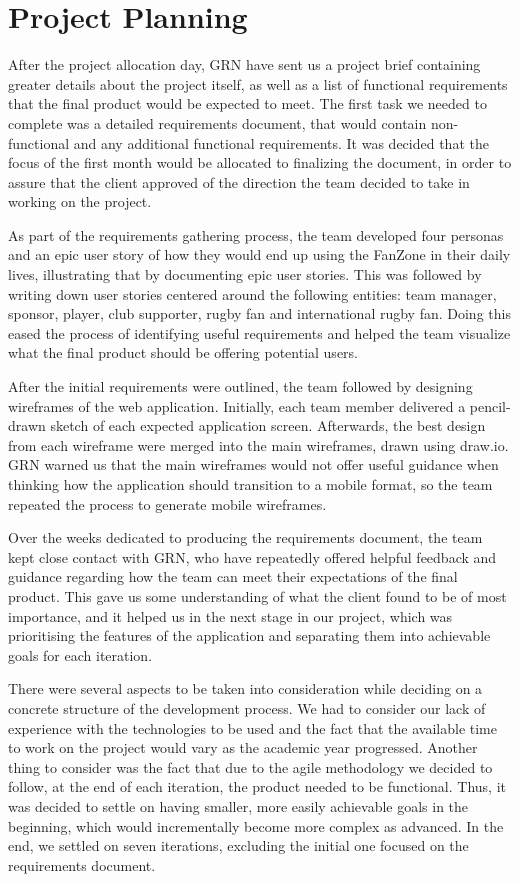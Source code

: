 \documentclass{l3proj}
\begin{document}
\section{Project Planning}
\label{sec:planning}

After the project allocation day, GRN have sent us a project brief containing
 greater details about the project itself, as well as a list of functional
 requirements that the final product would be expected to meet. The first
 task we needed to complete was a detailed requirements document, that would
 contain non-functional and any additional functional requirements. It was
 decided that the focus of the first month would be allocated to finalizing
 the document, in order to assure that the client approved of the direction
 the team decided to take in working on the project.

As part of the requirements gathering process, the team developed four personas
 and an epic user story of how they would end up using the FanZone in their daily
 lives, illustrating that by documenting epic user stories. This was followed by
 writing down user stories centered around the following entities: team manager,
 sponsor, player, club supporter, rugby fan and international rugby fan. Doing
 this eased the process of identifying useful requirements and helped the team
 visualize what the final product should be offering potential users.

After the initial requirements were outlined, the team followed by designing
 wireframes of the web application. Initially, each team member delivered a
 pencil-drawn sketch of each expected application screen. Afterwards, the
 best design from each wireframe were merged into the main wireframes, drawn
 using draw.io. GRN warned us that the main wireframes would not offer useful
 guidance when thinking how the application should transition to a mobile format,
 so the team repeated the process to generate mobile wireframes.

Over the weeks dedicated to producing the requirements document, the team
 kept close contact with GRN, who have repeatedly offered helpful feedback
 and guidance regarding how the team can meet their expectations of the
 final product. This gave us some understanding of what the client found
 to be of most importance, and it helped us in the next stage in our
 project, which was prioritising the features of the application and separating
  them into achievable goals for each iteration.

There were several aspects to be taken into consideration while deciding
 on a concrete structure of the development process. We had to consider
 our lack of experience with the technologies to be used and the fact
 that the available time to work on the project would vary as the academic
 year progressed. Another thing to consider was the fact that due to the
 agile methodology we decided to follow, at the end of each iteration, the
 product needed to be functional. Thus, it was decided to settle on having
 smaller, more easily achievable goals in the beginning, which would
 incrementally become more complex as advanced. In the end, we settled
 on seven iterations, excluding the initial one focused on the requirements
 document.
\end{document}
